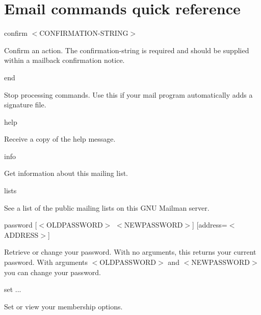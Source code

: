 \documentclass{howto}
\begin{document}
\section{Email commands quick reference\label{a:commands}}
\begin{list}{}{}
	\item confirm $<$CONFIRMATION-STRING$>$
		\begin{list}{}{}
			\item
        Confirm an action.  The confirmation-string is required and should be
        supplied within a mailback confirmation notice.
		\end{list}

   \item end
		\begin{list}{}{}
			\item
        Stop processing commands.  Use this if your mail program automatically
        adds a signature file.
		\end{list}

   \item help
		\begin{list}{}{}
			\item
        Receive a copy of the help message.
		\end{list}

   \item info
		\begin{list}{}{}
			\item
        Get information about this mailing list.
		\end{list}

   \item lists
		\begin{list}{}{}
			\item
        See a list of the public mailing lists on this GNU Mailman server.
		\end{list}

    \item {password [$<$OLDPASSWORD$>$ $<$NEWPASSWORD$>$] [address=$<$ADDRESS$>$]}
		\begin{list}{}{}
			\item
        Retrieve or change your password.  With no arguments, this returns
        your current password.  With arguments $<$OLDPASSWORD$>$ and $<$NEWPASSWORD$>$
        you can change your password.
		\end{list}

    \item set ...
		\begin{list}{}{}
			\item
        Set or view your membership options.


\end{list}
\end{list}
\end{document}
